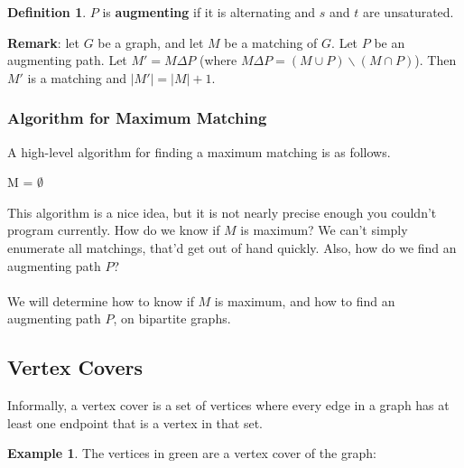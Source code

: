 \documentclass[]{article}
\theoremstyle{definition}
\newtheorem*{defn}{Definition}
\newtheorem{ex}{Example}[section]
\newcommand{\lecture}[1]{\marginpar{{\footnotesize $\leftarrow$ \underline{#1}}}}
\begin{document}
				\begin{defn}
					$P$ is \textbf{augmenting} if it is alternating and $s$ and $t$ are unsaturated.
				\end{defn}
				
				\textbf{Remark}: let $G$ be a graph, and let $M$ be a matching of $G$. Let $P$ be an augmenting path. Let $M' = M \Delta P$ (where $M \Delta P = (M \cup P) \backslash (M \cap P)$). Then $M'$ is a matching and $|M'| = |M| + 1$.
				
				\subsubsection{Algorithm for Maximum Matching} \lecture{April 1, 2013}
					A high-level algorithm for finding a maximum matching is as follows. \\
					\begin{algorithm}[H]
						M = $\emptyset$\;
					\end{algorithm}
					
					This algorithm is a nice idea, but it is not nearly precise enough \textendash{} you couldn't program currently. How do we know if $M$ is maximum? We can't simply enumerate all matchings, that'd get out of hand quickly. Also, how do we find an augmenting path $P$?
					\\ \\
					We will determine how to know if $M$ is maximum, and how to find an augmenting path $P$, on bipartite graphs.
				
		\subsection{Vertex Covers}
			Informally, a vertex cover is a set of vertices where every edge in a graph has at least one endpoint that is a vertex in that set.
			\begin{ex}
				The vertices in green are a vertex cover of the graph:
				\begin{center}
				\end{center}
			\end{ex}
			
\end{document}
